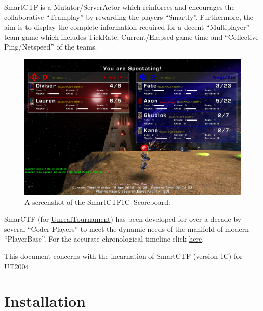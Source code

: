 \documentclass{article}
\newcommand{\SmartVersion}{1C}
\begin{document}
SmartCTF is a Mutator/ServerActor which reinforces and encourages the collaborative ``Teamplay'' by rewarding the players ``Smartly''.  Furthermore, the aim is to display the complete information required for a decent ``Multiplayer'' team game which includes TickRate, Current/Elapsed game time and ``Collective Ping/Netspeed'' of the teams.

\begin{figure}
\centering
\label{fig:smartscoreboard}
\includegraphics[width=1.1\textwidth]{img}
\caption{A screenshot of the SmartCTF\SmartVersion~Scoreboard.}
\end{figure}

SmarCTF (for \href{https://en.wikipedia.org/wiki/Unreal_Tournament}{\color{Blue}UnrealTournament}) has been developed for over a decade by several ``Coder Players'' to meet the dynamic needs of the manifold of modern ``PlayerBase''.  For the accurate chronological timeline click \href{http://wiki.unrealadmin.org/SmartCTF}{{\color{Blue}here}}.

This document concerns with the incarnation of SmartCTF (version \SmartVersion) for \href{https://en.wikipedia.org/wiki/Unreal_Tournament_2004}{{\color{Blue}UT2004}}. 

\section{Installation}
\end{document}
